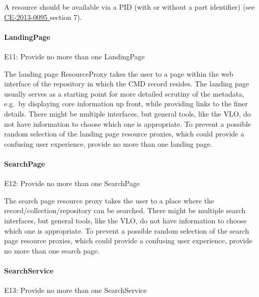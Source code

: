 
A resource should be available via a PID (with or without a part identifier) (see
\href{http://hdl.handle.net/1839/00-DOCS.CLARIN.EU-78}{CE-2013-0095 \cite{ce20130095}} section 7).

\paragraph{LandingPage}\label{landingpage}

\label{e11}
E11: Provide no more than one LandingPage


The landing page ResourceProxy takes the user to a page within the web interface of the repository in which the CMD record resides. The landing page usually serves as a starting point for more detailed scrutiny of the metadata, e.g.~by displaying core information up front, while providing links to the finer details. There might be multiple interfaces, but general tools, like the VLO, do not have information to choose which one is appropriate. To prevent a possible random selection
of the landing page resource proxies, which could provide a confusing user experience, provide no more than one landing page.

\paragraph{SearchPage}\label{searchpage}

E12: Provide no more than one SearchPage


The search page resource proxy takes the user to a place where the record/collection/repository can be searched. There might be multiple search interfaces, but general tools, like the VLO, do not have information to choose which one is appropriate. To prevent a possible random selection of the search page resource proxies, which could provide a confusing user experience, provide no more than one search page.

\paragraph{SearchService}\label{searchservice}

E13: Provide no more than one SearchService


